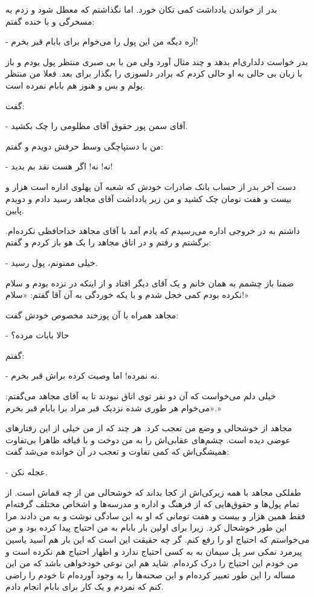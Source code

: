 \documentclass[12pt,a4paper]{book}
\begin{document}
بدر از خواندن یادداشت کمی تکان خورد. اما نگذاشتم که معطل شود و زدم به مسخرگی و با خنده گفتم:

- آره دیگه من این پول را می‌خوام برای بابام قبر بخرم!

بدر خواست دلداری‌ام بدهد و چند مثال آورد ولی من با بی صبری منتظر پول بودم و باز با زبان بی حالی به او حالی کردم که برادر دلسوزی را بگذار برای بعد. فعلا من منتظر پولم و بس و هنوز هم بابام نمرده است.

گفت:

- آقای سمن پور حقوق آقای مظلومی را چک بکشید.

من با دستپاچگی وسط حرفش دویدم و گفتم:

- نه! نه! اگر هست نقد بم بدید!

دست آخر بدر از حساب بانک صادرات خودش که شعبه آن پهلوی اداره است هزار و بیست و هفت تومان چک کشید و من زیر یادداشت آقای مجاهد رسید دادم و دویدم پایین.

داشتم به در خروجی اداره می‌رسیدم که یادم آمد با آقای مجاهد خداحافظی نکرده‌ام. برگشتم و رفتم و در اتاق مجاهد را یک هو باز کردم و گفتم:

- خیلی ممنونم، پول رسید.

ضمنا باز چشمم به همان خانم و یک آقای دیگر افتاد و از اینکه در نزده بودم و سلام نکرده بودم کمی خجل شدم و با یکه خوردگی به آن آقا گفتم: «سلام!»

مجاهد همراه با آن پوزخند مخصوص خودش گفت:

- حالا بابات مرده؟

گفتم:

- نه نمرده! اما وصیت کرده براش قبر بخرم.

خیلی دلم می‌خواست که آن دو نفر توی اتاق نبودند تا به آقای مجاهد می‌گفتم: «می‌خوام هر طوری شده نزدیک قبر مراد برا بابام قبر بخرم.»

مجاهد از خوشحالی و وضع من تعجب کرد. هر چند که از من خیلی از این رفتارهای عوضی دیده است. چشم‌های عقابی‌اش را به من دوخت و با قیافه ظاهرا بی‌تفاوت همیشگی‌اش که کمی تفاوت و تعجب در آن خوانده می‌شد گفت:

- عجله نکن.

طفلکی مجاهد با همه زیرکی‌اش از کجا بداند که خوشحالی من از چه قماش است. از تمام پول‌ها و حقوق‌هایی که از فرهنگ و اداره و مدرسه‌ها و اشخاص مختلف گرفته‌ام فقط همین هزار و بیست و هفت تومانی که او به این سادگی نوشت و به من دادند مرا این طور خوشحال کرد. زیرا برای اولین بار بابام به من احتیاج پیدا کرده بود و من می‌خواستم که احتیاج او را رفع کنم. گر چه حقیقت این است که این بار هم آسید یاسین پیرمرد نمکی سر پل سیمان به به کسی احتیاج ندارد و اظهار احتیاج هم نکرده است و من خودم این احتیاج را درک کرده‌ام. شاید هم این نوعی خودخواهی باشد که من این مساله را این طور تعبیر کرده‌ام و این صحنه‌ها را به وجود آورده‌ام تا خودم را راضی کنم که نمردم و یک کار برای بابام انجام دادم.
\end{document}
